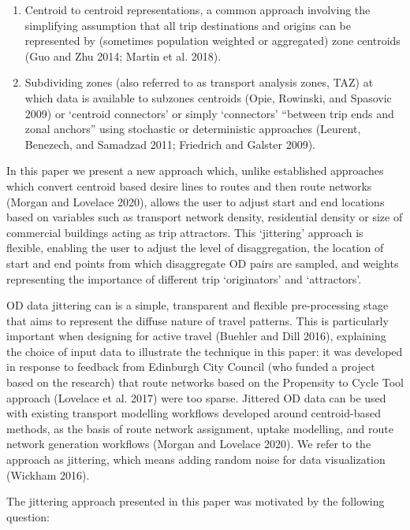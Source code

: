 \documentclass[
]{article}
\providecommand{\tightlist}{%
  \setlength{\itemsep}{0pt}\setlength{\parskip}{0pt}}
\begin{document}
\begin{enumerate}
\def\labelenumi{\arabic{enumi}.}
\tightlist
\item
  Centroid to centroid representations, a common approach involving the simplifying assumption that all trip destinations and origins can be represented by (sometimes population weighted or aggregated) zone centroids (Guo and Zhu 2014; Martin et al. 2018).
\item
  Subdividing zones (also referred to as transport analysis zones, TAZ) at which data is available to subzones centroids (Opie, Rowinski, and Spasovic 2009) or `centroid connectors' or simply `connectors' ``between trip ends and zonal anchors'' using stochastic or deterministic approaches (Leurent, Benezech, and Samadzad 2011; Friedrich and Galster 2009).
\end{enumerate}

In this paper we present a new approach which, unlike established approaches which convert centroid based desire lines to routes and then route networks (Morgan and Lovelace 2020), allows the user to adjust start and end locations based on variables such as transport network density, residential density or size of commercial buildings acting as trip attractors.
This `jittering' approach is flexible, enabling the user to adjust the level of disaggregation, the location of start and end points from which disaggregate OD pairs are sampled, and weights representing the importance of different trip `originators' and `attractors'.

OD data jittering can is a simple, transparent and flexible pre-processing stage that aims to represent the diffuse nature of travel patterns.
This is particularly important when designing for active travel (Buehler and Dill 2016), explaining the choice of input data to illustrate the technique in this paper: it was developed in response to feedback from Edinburgh City Council (who funded a project based on the research) that route networks based on the Propensity to Cycle Tool approach (Lovelace et al. 2017) were too sparse.
Jittered OD data can be used with existing transport modelling workflows developed around centroid-based methods, as the basis of route network assignment, uptake modelling, and route network generation workflows (Morgan and Lovelace 2020).
We refer to the approach as jittering, which means adding random noise for data visualization (Wickham 2016).

The jittering approach presented in this paper was motivated by the following question:
\end{document}
